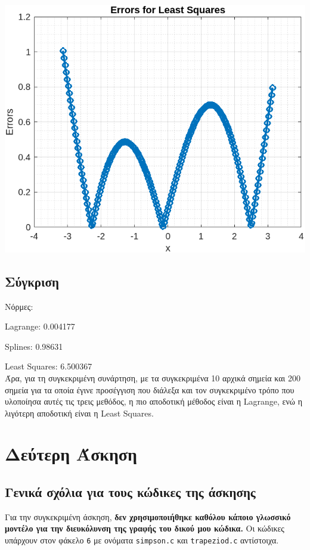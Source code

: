 \documentclass[a4paper, 14pt]{article}   %
\begin{document}
\begin{center}   %
	\includegraphics[scale=0.75]{leastSquaresErrors.png}
\end{center}   %

\subsection*{Σύγκριση}   %
Νόρμες:

Lagrange: 0.004177

Splines: 0.98631

Least Squares: 6.500367\\
Άρα, για τη συγκεκριμένη συνάρτηση, με τα συγκεκριμένα 10 αρχικά σημεία και 200 σημεία για τα οποία έγινε προσέγγιση που διάλεξα και τον συγκεκριμένο τρόπο που υλοποίησα αυτές τις τρεις μεθόδος, η πιο αποδοτική μέθοδος είναι η Lagrange, ενώ η λιγότερη αποδοτική είναι η Least Squares.

\section*{Δεύτερη Άσκηση}   %

\subsection*{Γενικά σχόλια για τους κώδικες της άσκησης}   %
	Για την συγκεκριμένη άσκηση, \textbf{δεν χρησιμοποιήθηκε καθόλου κάποιο γλωσσικό μοντέλο για την διευκόλυνση της γραφής του δικού μου κώδικα.} Οι κώδικες υπάρχουν στον φάκελο \texttt{6} με ονόματα \texttt{simpson.c} και \texttt{trapeziod.c} αντίστοιχα.
\end{document}
